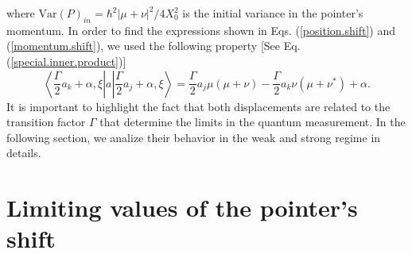 \documentclass[aps,pra,preprint,superscriptaddress, showpacs]{revtex4-2}
\begin{document}
where $\textrm{Var}(P)_{in}=\hbar^2|\mu+\nu|^2/4X_{0}^{2}$ is the initial variance in the pointer's momentum. In order to find the expressions shown in Eqs. (\ref{position.shift}) and (\ref{momentum.shift}), we used the following property [See Eq. (\ref{special.inner.product})] 
\begin{equation}
\left\langle \frac{\Gamma}{2}a_{k}+\alpha, \xi\right|a\left|\frac{\Gamma}{2}a_{j}+\alpha, \xi\right\rangle=\frac{\Gamma}{2}a_{j}\mu(\mu+\nu)-\frac{\Gamma}{2}a_{k}\nu(\mu+\nu^{*})+\alpha.
\end{equation}
It is important to highlight the fact that both displacements are related to the transition factor $\Gamma$ that determine the limits in the quantum measurement. In the following section, we analize their behavior in the weak and strong regime in details.

\section{\label{sec:formalism2}Limiting values of the pointer's shift}

\end{document}
